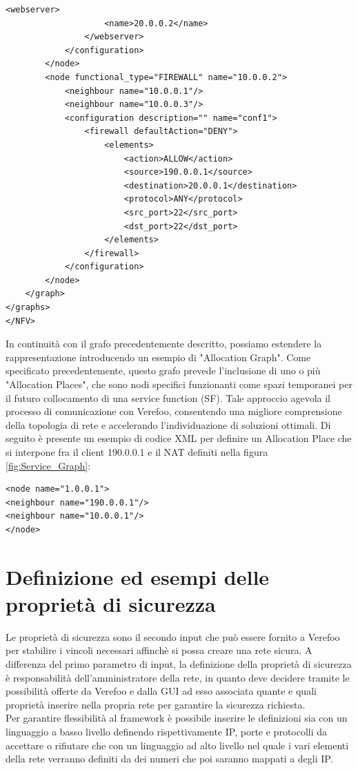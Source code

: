 \begin{lstlisting}[style=mystyle,caption={Definizione nodi del ServiceGraph \ref*{fig:Service_Graph}}, label= lst:service_graphh]
                <webserver>
                    <name>20.0.0.2</name>
                </webserver>
            </configuration>
        </node>
        <node functional_type="FIREWALL" name="10.0.0.2">
            <neighbour name="10.0.0.1"/>
            <neighbour name="10.0.0.3"/>
            <configuration description="" name="conf1">
                <firewall defaultAction="DENY">
                    <elements>
                        <action>ALLOW</action>
                        <source>190.0.0.1</source>
                        <destination>20.0.0.1</destination>
                        <protocol>ANY</protocol>
                        <src_port>22</src_port>
                        <dst_port>22</dst_port>
                    </elements>
                </firewall>
            </configuration>
        </node>
    </graph>
</graphs>
</NFV>
\end{lstlisting}

In continuità con il grafo precedentemente descritto, possiamo estendere la rappresentazione introducendo un esempio di "Allocation Graph". 
Come specificato precedentemente, questo grafo prevede l'inclusione di uno o più "Allocation Places", che sono nodi specifici funzionanti come spazi temporanei per il futuro collocamento di una service function (SF). 
Tale approccio agevola il processo di comunicazione con Verefoo, consentendo una migliore comprensione della topologia di rete e accelerando l'individuazione di soluzioni ottimali. 
Di seguito è presente un esempio di codice XML per definire un Allocation Place che si interpone fra il client 190.0.0.1 e il NAT definiti nella figura \ref{fig:Service_Graph}: 

\begin{lstlisting}[style=mystyle,caption={Definizione Allocation Place per Allocation Graph}]
<node name="1.0.0.1">
<neighbour name="190.0.0.1"/>
<neighbour name="10.0.0.1"/>
</node>
\end{lstlisting}

\newpage

\section{Definizione ed esempi delle proprietà di sicurezza}
\label{SecurityRequirementsDef}
Le proprietà di sicurezza sono il secondo input che può essere fornito a Verefoo per stabilire i vincoli necessari affinchè
si possa creare una rete sicura. A differenza del primo parametro di input, la definizione della proprietà di sicurezza è 
responsabilità dell'amministratore della rete, in quanto deve decidere tramite le possibilità offerte da Verefoo e dalla GUI ad esso associata
quante e quali proprietà inserire nella propria rete per garantire la sicurezza richiesta.\\
Per garantire flessibilità al framework è possibile inserire le definizioni sia con un linguaggio a basso livello definendo rispettivamente IP, porte e protocolli
da accettare o rifiutare che con un linguaggio ad alto livello nel quale i vari elementi della rete verranno definiti da dei numeri che poi saranno mappati a degli IP.

